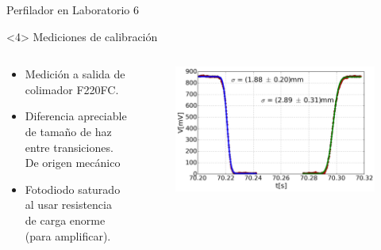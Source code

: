 \begin{frame}{Perfilador en Laboratorio 6}
    \begin{onlyenv}<4>
        Mediciones de calibración
        \begin{columns}[c]
            \begin{column}{0.4\textwidth}
               \begin{itemize}
                    \item Medición a salida de colimador F220FC.
                    \item Diferencia apreciable de tamaño de haz entre transiciones. De origen mecánico
                    \item Fotodiodo saturado al usar resistencia de carga enorme (para amplificar).
                \end{itemize}
            \end{column}

            \begin{column}{0.6\textwidth}
                \begin{figure}
                    \includegraphics[width=\textwidth]{fig/perfilador/fit_data_labo6}
                    \label{fig:perfilador/fit_data_labo6}
                \end{figure} 
            \end{column}
        \end{columns}
        
    \end{onlyenv}
    
\end{frame}



